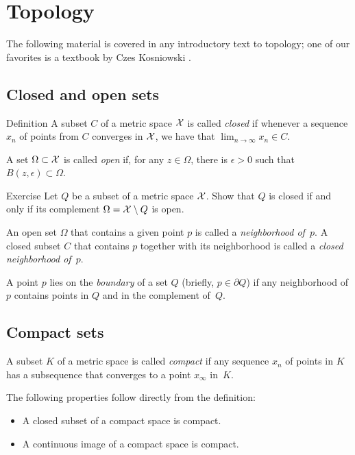 \section{Topology}\label{sec:topology}

The following material is covered in any introductory text to topology; 
one of our favorites is a textbook by Czes Kosniowski \cite{kosniowski}.

\subsection*{Closed and open sets}

\begin{thm}{Definition}
A subset $C$ of a metric space $\mathcal{X}$ is called \emph{closed} if whenever a sequence $x_n$ of points from $C$ converges in $\mathcal{X}$, we have that $\lim_{n\to\infty} x_n \in C$.

A set $\Omega \subset \mathcal{X}$ is called \emph{open} if, for any $z\in \Omega$, 
there is $\epsilon>0$ such that $B(z,\epsilon)\subset\Omega$.
\end{thm}

\begin{thm}{Exercise}\label{ex:close-open}
Let $Q$ be a subset of a metric space $\mathcal{X}$.
Show that $Q$ is closed if and only if its complement $\Omega=\mathcal{X}\setminus Q$ is open.
\end{thm}

An open set $\Omega$ that contains a given point $p$ is called a \emph{neighborhood of~$p$}.
A closed subset $C$ that contains $p$ together with its neighborhood is called a {}\emph{closed neighborhood of~$p$}.

A point $p$ lies on the \emph{boundary} of a set $Q$ (briefly, $p\in\partial Q$) if any neighborhood of $p$ contains points in $Q$ and in the complement of~$Q$.

\subsection*{Compact sets}

A subset $K$ of a metric space is called \emph{compact} if any sequence $x_n$ of points in $K$ has a subsequence that converges to a point $x_\infty$ in~$K$.

The following properties follow directly from the definition:

\begin{itemize}
\item A closed subset of a compact space is compact.
\item A continuous image of a compact space is compact.
\end{itemize}

